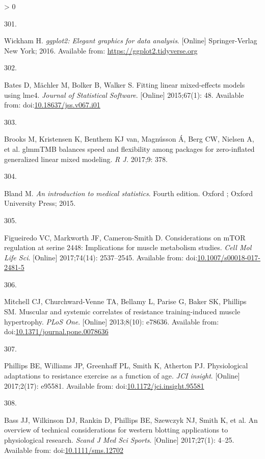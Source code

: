\documentclass[twoside,10pt]{gihclass} %
\newlength{\cslhangindent}
\newlength{\csllabelwidth}
\newenvironment{CSLReferences}[3] %
 {%
  \setlength{\parindent}{0pt}
  \ifodd #1 \everypar{\setlength{\hangindent}{\cslhangindent}}\ignorespaces\fi
  \ifnum #2 > 0
  \setlength{\parskip}{#2\baselineskip}
  \fi
 }%
 {}
\newcommand{\CSLLeftMargin}[1]{\parbox[t]{\maxof{\widthof{#1}}{\csllabelwidth}}{#1}}
\newcommand{\CSLRightInline}[1]{\parbox[t]{\linewidth}{#1}}
\begin{document}
\begin{CSLReferences}{0}{0}
\leavevmode\hypertarget{ref-ggplot2}{}%
\CSLLeftMargin{301. }
\CSLRightInline{Wickham H. \emph{ggplot2: Elegant graphics for data analysis}. {[}Online{]} Springer-Verlag New York; 2016. Available from: \url{https://ggplot2.tidyverse.org}}

\leavevmode\hypertarget{ref-RN1819}{}%
\CSLLeftMargin{302. }
\CSLRightInline{Bates D, Mächler M, Bolker B, Walker S. Fitting linear mixed-effects models using lme4. \emph{Journal of Statistical Software}. {[}Online{]} 2015;67(1): 48. Available from: doi:\href{https://doi.org/10.18637/jss.v067.i01}{10.18637/jss.v067.i01}}

\leavevmode\hypertarget{ref-RN2626}{}%
\CSLLeftMargin{303. }
\CSLRightInline{Brooks M, Kristensen K, Benthem KJ van, Magnússon Á, Berg CW, Nielsen A, et al. glmmTMB balances speed and flexibility among packages for zero-inflated generalized linear mixed modeling. \emph{R J.} 2017;9: 378. }

\leavevmode\hypertarget{ref-RN2007}{}%
\CSLLeftMargin{304. }
\CSLRightInline{Bland M. \emph{An introduction to medical statistics}. Fourth edition. Oxford ; Oxford University Press; 2015. }

\leavevmode\hypertarget{ref-RN2309}{}%
\CSLLeftMargin{305. }
\CSLRightInline{Figueiredo VC, Markworth JF, Cameron-Smith D. Considerations on mTOR regulation at serine 2448: Implications for muscle metabolism studies. \emph{Cell Mol Life Sci}. {[}Online{]} 2017;74(14): 2537--2545. Available from: doi:\href{https://doi.org/10.1007/s00018-017-2481-5}{10.1007/s00018-017-2481-5}}

\leavevmode\hypertarget{ref-RN788}{}%
\CSLLeftMargin{306. }
\CSLRightInline{Mitchell CJ, Churchward-Venne TA, Bellamy L, Parise G, Baker SK, Phillips SM. Muscular and systemic correlates of resistance training-induced muscle hypertrophy. \emph{PLoS One}. {[}Online{]} 2013;8(10): e78636. Available from: doi:\href{https://doi.org/10.1371/journal.pone.0078636}{10.1371/journal.pone.0078636}}

\leavevmode\hypertarget{ref-RN2171}{}%
\CSLLeftMargin{307. }
\CSLRightInline{Phillips BE, Williams JP, Greenhaff PL, Smith K, Atherton PJ. Physiological adaptations to resistance exercise as a function of age. \emph{JCI insight}. {[}Online{]} 2017;2(17): e95581. Available from: doi:\href{https://doi.org/10.1172/jci.insight.95581}{10.1172/jci.insight.95581}}

\leavevmode\hypertarget{ref-RN1942}{}%
\CSLLeftMargin{308. }
\CSLRightInline{Bass JJ, Wilkinson DJ, Rankin D, Phillips BE, Szewczyk NJ, Smith K, et al. An overview of technical considerations for western blotting applications to physiological research. \emph{Scand J Med Sci Sports}. {[}Online{]} 2017;27(1): 4--25. Available from: doi:\href{https://doi.org/10.1111/sms.12702}{10.1111/sms.12702}}


\end{CSLReferences}
\end{document}
